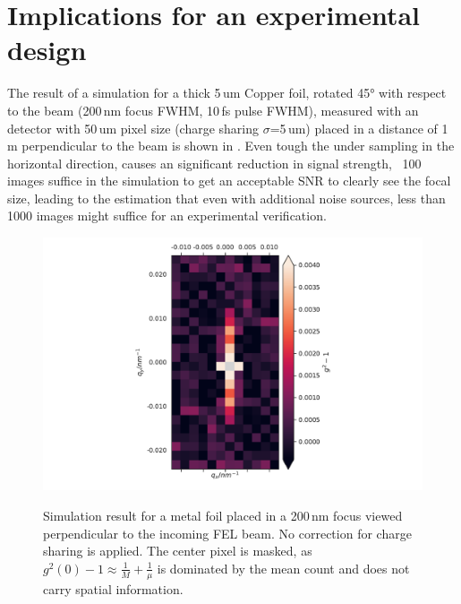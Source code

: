 \section{Implications for an experimental design}

The result of a simulation for a thick 5\,um Copper foil, rotated 45° with respect to the beam (200\,nm focus FWHM, 10\,fs pulse FWHM), measured with an detector with 50\,um pixel size (charge sharing $\sigma$=5\,um) placed in a distance of 1\,m  perpendicular to the beam is shown in . Even tough the under sampling in the horizontal direction, causes an significant reduction in signal strength, ~100 images suffice in the simulation to get an acceptable SNR to clearly see the  focal size, leading to the estimation that even with additional noise sources, less than 1000 images might suffice for an experimental verification.

\begin{figure}
	\centering
	\includegraphics[width=0.5\linewidth]{images/sim_foil5umCu_shared.pdf}
	\label{fig:simfoil}
	\caption[Simulation of a metal foil with similar parameters as used in the experiment]{Simulation result for a metal foil placed in a 200\,nm focus viewed perpendicular to the incoming FEL beam. No correction for charge sharing is applied. The center pixel is masked, as $g^2(0)-1\approx 
		\frac{1}{M}+\frac{1}{\mu}$ is dominated by the mean count and does 
		not carry spatial information.}
\end{figure}

